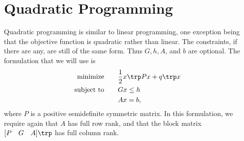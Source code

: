 \begin{comment}
>>> h = matrix([-7., -2., -4., -5., -8.,  0., 0., 0., 0., 0., 0.,])
>>> o = matrix([4., 7., 6., 8., 8., 9])
>>> sol = glpk.ilp(o,G,h)
>>> print sol[1]
\end{lstlisting}

or
\begin{lstlisting}
>>> from cvxopt import matrix, solvers, glpk
>>> G = matrix([ [-1., 0., 0., 0., 0., 0.],
             [0., -1., 0., 0., 0., 0.],
             [0., 0., -1., 0., 0., 0.],
             [0., 0., 0., -1., 0., 0.],
             [0., 0., 0., 0., -1., 0.],
             [0., 0., 0., 0., 0., -1.] ])

>>> h = matrix([ 0., 0., 0., 0., 0., 0.,])
>>> o = matrix([4., 7., 6., 8., 8., 9])
>>> A = matrix([ [1., 0., 0., 1., 0.],
             [1., 0., 0., 0., 1.],
             [0., 1., 0., 1., 0.],
             [0., 1., 0., 0., 1.],
             [0., 0., 1., 1., 0.],
             [0., 0., 1., 0., 1.] ])
>>> b = matrix([7., 2., 4., 5., 8])
>>> sol = glpk.ilp(o,G,h,A,b)
>>> print sol[1]
\end{lstlisting}

\textbf{Problem 2}
Choose one of these methods and compare the optimal values for the integer linear program to the result you received above.

\textbf{Problem 3}
Create the dual problem for the linear program and solve.
Compare your answer to the dual value cvxopt returned.
\end{comment}

\section*{Quadratic Programming}

Quadratic programming is similar to linear programming, one exception being that the objective function is quadratic rather than linear.
The constraints, if there are any, are still of the same form.
Thus $G, h, A$, and $b$ are optional. The formulation that we will use is
\begin{align*}
\text{minimize}\qquad &\frac{1}{2}x\trp Px + q\trp x \\
\text{subject to}\qquad &Gx \leq h\\
 &Ax = b,
\end{align*}
where $P$ is a positive semidefinite symmetric matrix.
In this formulation, we require again that $A$ has full row rank, and that the block matrix
$[P \quad G \quad A]\trp $ has full column rank.

